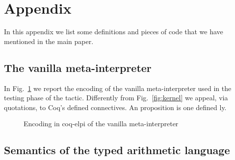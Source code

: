 
\section{Appendix}
\label{sec:app}

In this appendix we list some definitions and pieces of code that we have  mentioned in the main paper.

\subsection{The vanilla meta-interpreter}


In Fig.~\ref{fig:interp} we report the encoding of the vanilla meta-interpreter used in
the testing phase of the  tactic. Differently from Fig.~\ref{fig:kernel} we appeal, via quotations, to Coq's defined connectives. An  proposition is one defined ly. %

\begin{figure}


\caption{Encoding in coq-elpi of the vanilla meta-interpreter}
\label{fig:interp}
%
%
\end{figure}

\subsection{Semantics of the typed arithmetic language}
\label{ssec:types}

